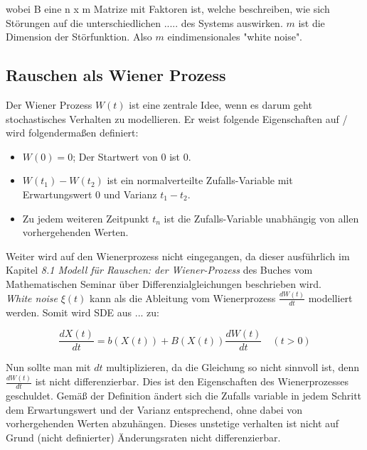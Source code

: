wobei B eine n x m Matrize mit Faktoren ist, welche beschreiben, wie sich Störungen auf die unterschiedlichen ..... des Systems auswirken. $ m $ ist die Dimension der Störfunktion. Also $ m $ eindimensionales "white noise".\\


\subsection{Rauschen als Wiener Prozess
\label{brown:subsection:wiener}}

Der Wiener Prozess $ W(t) $ ist eine zentrale Idee, wenn es darum geht stochastisches Verhalten zu modellieren. Er weist folgende Eigenschaften auf / wird folgendermaßen definiert:


\begin{itemize}
	\item $ W(0) = 0 $; Der Startwert von 0 ist 0.
	\item $ W(t_{1}) - W(t_{2}) $ ist ein normalverteilte Zufalls-Variable mit Erwartungswert 0 und Varianz $ t_{1} - t_{2} $.
	\item Zu jedem weiteren Zeitpunkt $ t_{n} $ ist die Zufalls-Variable unabhängig von allen vorhergehenden Werten.
\end{itemize}

Weiter wird auf den Wienerprozess nicht eingegangen, da dieser ausführlich im Kapitel \glqq \textit{8.1 Modell für Rauschen: der Wiener-Prozess}\glqq{} des Buches vom Mathematischen Seminar über Differenzialgleichungen beschrieben wird.\\


\textit{White noise} $ \xi(t) $ kann als die Ableitung vom Wienerprozess $ \frac{dW(t)}{dt} $ modelliert werden. Somit wird SDE aus ... zu: 

\begin{equation}
	\frac{dX(t)}{dt} = b(X(t)) + B(X(t)) \frac{dW(t)}{dt} \quad (t>0)
\end{equation}

Nun sollte man mit $ dt $  multiplizieren, da die Gleichung so nicht sinnvoll ist, denn $ \frac{dW(t)}{dt} $ ist nicht differenzierbar. Dies ist den Eigenschaften des Wienerprozesses geschuldet. Gemäß der Definition ändert sich die Zufalls variable in jedem Schritt dem Erwartungswert und der Varianz entsprechend, ohne dabei von vorhergehenden Werten abzuhängen. Dieses unstetige verhalten ist nicht auf Grund (nicht definierter) Änderungsraten nicht differenzierbar.

